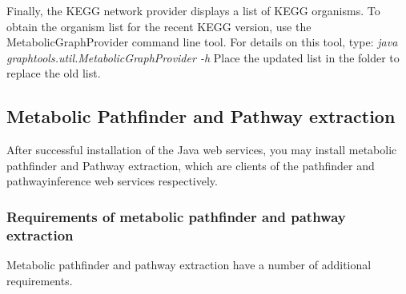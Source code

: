 \documentclass{book}
\begin{document}
Finally, the KEGG network provider displays a list of KEGG organisms. To obtain the
organism list for the recent KEGG version, use the MetabolicGraphProvider command line
tool. For details on this tool, type: \textit{java graphtools.util.MetabolicGraphProvider -h}
Place the updated list in the folder  to replace the old list.

\subsection{Metabolic Pathfinder and Pathway extraction}
After successful installation of the Java web services, you may install metabolic pathfinder
and Pathway extraction, which are clients of the pathfinder and pathwayinference web services respectively.

\subsubsection{Requirements of metabolic pathfinder and pathway extraction}

Metabolic pathfinder and pathway extraction have a number of additional requirements.
\end{document}
